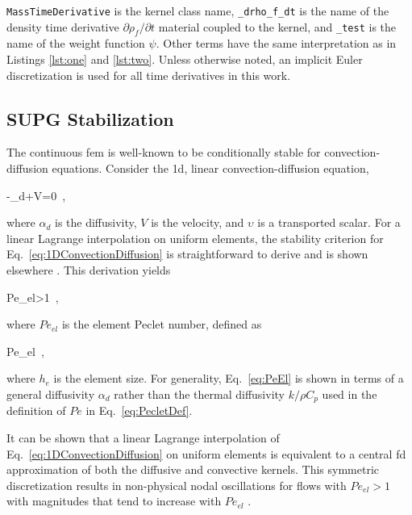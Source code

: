 \texttt{MassTimeDerivative} is the kernel class name, \texttt{\_drho\_f\_dt} is the name of the density time derivative \(\partial\rho_f/\partial t\) material coupled to the kernel, and \texttt{\_test} is the name of the weight function \(\psi\). Other terms have the same interpretation as in Listings \ref{lst:one} and \ref{lst:two}. Unless otherwise noted, an implicit Euler discretization is used for all time derivatives in this work.

\subsection[Streamline Upwind Petrov-Galerkin Stabilization]{SUPG Stabilization}
\label{sec:supg}

The continuous \gls{fem} is well-known to be conditionally stable for convection-diffusion equations. Consider the \gls{1d}, linear convection-diffusion equation,

\beq
\label{eq:1DConvectionDiffusion}
-\alpha_d+V=0\ ,
\eeq

\noindent where \(\alpha_d\) is the diffusivity, \(V\) is the velocity, and \(\upsilon\) is a transported scalar. For a linear Lagrange interpolation on uniform elements, the stability criterion for Eq.\ \eqref{eq:1DConvectionDiffusion} is straightforward to derive and is shown elsewhere \cite{novak_manual_2020}. This derivation yields

\beq
\label{eq:PeCriterion}
Pe_{el}>1\ ,
\eeq

\noindent where \(Pe_{el}\) is the element Peclet number, defined as

\beq
\label{eq:PeEl}
Pe_{el}\equiv{}\ ,
\eeq

\noindent where \(h_e\) is the element size. For generality, Eq.\ \eqref{eq:PeEl} is shown in terms of a general diffusivity \(\alpha_d\) rather than the thermal diffusivity \(k/\rho C_p\) used in the definition of \(Pe\) in Eq.\ \eqref{eq:PecletDef}. 

It can be shown that a linear Lagrange interpolation of Eq.\ \eqref{eq:1DConvectionDiffusion} on uniform elements is equivalent to a central \gls{fd} approximation of both the diffusive and convective kernels. This symmetric discretization results in non-physical nodal oscillations for flows with \(Pe_{el}>1\) with magnitudes that tend to increase with \(Pe_{el}\) \cite{novak_manual_2020,zienkiewicz}. 

